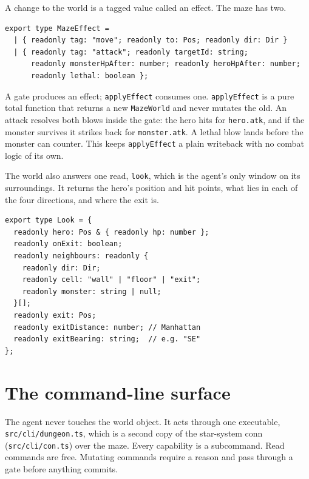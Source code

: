 \documentclass[11pt]{article}
\newcommand{\code}[1]{\texttt{#1}}
\begin{document}
A change to the world is a tagged value called an effect. The maze has two.

\begin{lstlisting}[language=TS]
export type MazeEffect =
  | { readonly tag: "move"; readonly to: Pos; readonly dir: Dir }
  | { readonly tag: "attack"; readonly targetId: string;
      readonly monsterHpAfter: number; readonly heroHpAfter: number;
      readonly lethal: boolean };
\end{lstlisting}

A gate produces an effect; \code{applyEffect} consumes one. \code{applyEffect} is
a pure total function that returns a new \code{MazeWorld} and never mutates the
old. An attack resolves both blows inside the gate: the hero hits for
\code{hero.atk}, and if the monster survives it strikes back for
\code{monster.atk}. A lethal blow lands before the monster can counter. This
keeps \code{applyEffect} a plain writeback with no combat logic of its own.

The world also answers one read, \code{look}, which is the agent's only window on
its surroundings. It returns the hero's position and hit points, what lies in
each of the four directions, and where the exit is.

\begin{lstlisting}[language=TS]
export type Look = {
  readonly hero: Pos & { readonly hp: number };
  readonly onExit: boolean;
  readonly neighbours: readonly {
    readonly dir: Dir;
    readonly cell: "wall" | "floor" | "exit";
    readonly monster: string | null;
  }[];
  readonly exit: Pos;
  readonly exitDistance: number; // Manhattan
  readonly exitBearing: string;  // e.g. "SE"
};
\end{lstlisting}

\section{The command-line surface}

The agent never touches the world object. It acts through one executable,
\code{src/cli/dungeon.ts}, which is a second copy of the star-system conn
(\code{src/cli/con.ts}) over the maze. Every capability is a subcommand. Read
commands are free. Mutating commands require a reason and pass through a gate
before anything commits.
\end{document}
